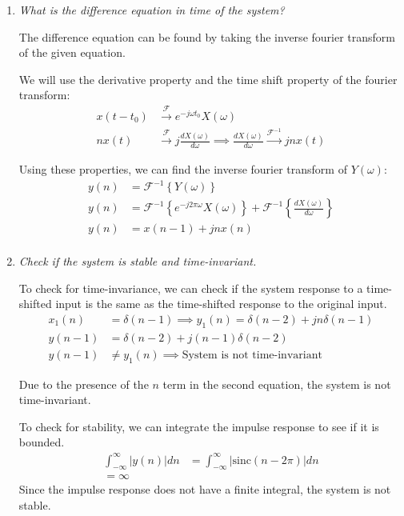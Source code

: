 \documentclass{article}
\begin{document}
\begin{enumerate}[label=(\alph*)]
    \item \textit{What is the difference equation in time of the system?}

    The difference equation can be found by taking the inverse fourier transform of the given equation. 

    We will use the derivative property and the time shift property of the fourier transform:
    \begin{align*}
        x(t-t_0) &\xrightarrow{\mathcal{F}} e^{-j\omega t_0}X(\omega) \\
        nx(t) &\xrightarrow{\mathcal{F}} j \frac{dX(\omega)}{d\omega} \implies \frac{dX(\omega)}{d\omega} \xrightarrow{\mathcal{F}^{-1}} jnx(t)
    \end{align*}

    Using these properties, we can find the inverse fourier transform of $Y(\omega)$:
    \begin{align*}
        y(n) &= \mathcal{F}^{-1}\left\{Y(\omega)\right\} \\
        y(n) &= \mathcal{F}^{-1}\left\{e^{-j2\pi \omega}X(\omega)\right\} + \mathcal{F}^{-1}\left\{\frac{dX(\omega)}{d\omega}\right\} \\
        y(n) &= x(n-1) + jnx(n) \\
    \end{align*}

    \item \textit{Check if the system is stable and time-invariant.}

    To check for time-invariance, we can check if the system response to a time-shifted input is the same as the time-shifted response to the original input.
    \begin{align*}
        x_1(n) &= \delta(n-1) \implies y_1(n) = \delta(n-2) + jn\delta(n-1) \\
        y(n-1) &= \delta(n-2) + j(n-1)\delta(n-2) \\
        y(n-1) &\neq y_1(n) \implies \text{System is not time-invariant}
    \end{align*}

    Due to the presence of the $n$ term in the second equation, the system is not time-invariant.

    To check for stability, we can integrate the impulse response to see if it is bounded.
    \begin{align*}
        \int_{-\infty}^{\infty} |y(n)| dn &= \int_{-\infty}^{\infty} |\text{sinc}(n-2\pi)| dn \\
        = \infty
    \end{align*}
    Since the impulse response does not have a finite integral, the system is not stable.
\end{enumerate}

\end{document}
